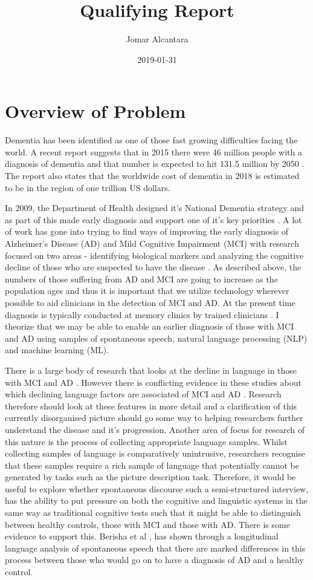 \documentclass[10pt, letterpaper, twoside, openany]{book}
\title{Qualifying Report}
\date{2019-01-31}
\author{Jomar Alcantara}
\begin{document}
\maketitle
\newpage
\tableofcontents
\listoftables
\listoffigures
\newpage
\chapter{Overview of Problem}
Dementia has been identified as one of those fast growing difficulties facing the world. A recent report suggests that in 2015 there were 46 million people with a diagnosis of dementia and that number is expected to hit 131.5 million by 2050 \cite{Prince2015}. The report also states that the worldwide cost of dementia in 2018 is estimated to be in the region of one trillion US dollars.
\par
In 2009, the Department of Health designed it's National Dementia strategy and as part of this made early diagnosis and support one of it's key priorities \cite{England2009}. A lot of work has gone into trying to find ways of improving the early diagnosis of Alzheimer's Disease (AD) and Mild Cognitive Impairment (MCI) with research focused on two areas - identifying biological markers and analyzing the cognitive decline of those who are suspected to have the disease \cite{Taler2008}. As described above, the numbers of those suffering from AD and MCI are going to increase as the population ages \cite{Prince2015} and thus it is important that we utilize technology wherever possible to aid clinicians in the detection of MCI and AD. At the present time diagnosis is typically conducted at memory clinics by trained clinicians \cite{Boschi2017}. I theorize that we may be able to enable an earlier diagnosis of those with MCI and AD using samples of spontaneous speech, natural language processing (NLP) and machine learning (ML).
\par
There is a large body of research that looks at the decline in language in those with MCI and AD \cite{Taler2008, Boschi2017}. However there is conflicting evidence in these studies about which declining language factors are associated of MCI and AD \cite{Taler2008, Boschi2017}. Research therefore should look at these features in more detail and a clarification of this currently disorganised picture should go some way to helping researchers further understand the disease and it's progression. Another area of focus for research of this nature is the process of collecting appropriate language samples. Whilst collecting samples of language is comparatively unintrusive, researchers recognise that these samples require a rich sample of language that potentially cannot be generated by tasks such as the picture description task. Therefore, it would be useful to explore whether spontaneous discourse such a semi-structured interview, has the ability to put pressure on both the cognitive and linguistic systems in the same way as traditional cognitive tests such that it might be able to distinguish between healthy controls, those with MCI and those with AD. There is some evidence to support this. Berisha et al \cite{Berisha2015}, has shown through a longitudinal language analysis of spontaneous speech that there are marked differences in this process between those who would go on to have a diagnosis of AD and a healthy control. 
\end{document}
